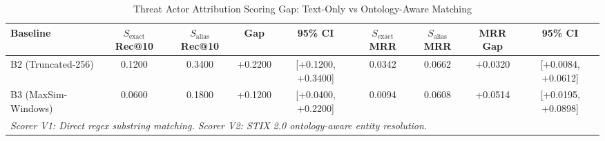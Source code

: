 \begin{table}[htbp]
\centering
\caption{Threat Actor Attribution Scoring Gap: Text-Only vs Ontology-Aware Matching}
\label{tab:scoring_gap}
\small
\begin{tabular}{lcccccccc}
\hline
\textbf{Baseline} & \textbf{$S_{\text{exact}}$ Rec@10} & \textbf{$S_{\text{alias}}$ Rec@10} & \textbf{Gap} & \textbf{95\% CI} & \textbf{$S_{\text{exact}}$ MRR} & \textbf{$S_{\text{alias}}$ MRR} & \textbf{MRR Gap} & \textbf{95\% CI} \\
\hline
B2 (Truncated-256) & 0.1200 & 0.3400 & +0.2200 & [+0.1200, +0.3400] & 0.0342 & 0.0662 & +0.0320 & [+0.0084, +0.0612] \\
B3 (MaxSim-Windows) & 0.0600 & 0.1800 & +0.1200 & [+0.0400, +0.2200] & 0.0094 & 0.0608 & +0.0514 & [+0.0195, +0.0898] \\
\hline
\multicolumn{9}{l}{\textit{Scorer V1: Direct regex substring matching. Scorer V2: STIX 2.0 ontology-aware entity resolution.}} \\
\end{tabular}
\end{table}

